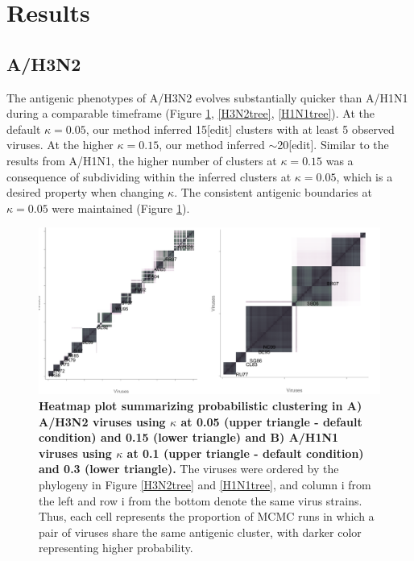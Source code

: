 \documentclass[11pt,oneside,letterpaper]{article}
\begin{document}
\newpage

\section*{Results}

\subsection*{A/H3N2}
The antigenic phenotypes of A/H3N2 evolves substantially quicker than A/H1N1 during a comparable timeframe (Figure \ref{heatmaps}, \ref{H3N2tree}, \ref{H1N1tree}).  %
At the default $\kappa=0.05$, our method inferred 15[edit] clusters with at least 5 observed viruses.  
At the higher $\kappa=0.15$, our method inferred $\sim$20[edit]. 
Similar to the results from A/H1N1, the higher number of clusters at $\kappa=0.15$ was a consequence of subdividing within the inferred clusters at $\kappa=0.05$, which is a desired property when changing $\kappa$.
The consistent antigenic boundaries at $\kappa=0.05$ were maintained (Figure \ref{heatmaps}). 

\begin{figure}[h]
	\centering		
	\includegraphics[width=1\textwidth]{figures/lineArt/combine_h3n2_h1n1_heatmaps}
	\caption{\textbf{Heatmap plot summarizing probabilistic clustering in A) A/H3N2 viruses using $\kappa$ at 0.05 (upper triangle - default condition) and 0.15 (lower triangle) and  B) A/H1N1 viruses using $\kappa$ at 0.1 (upper triangle - default condition) and 0.3 (lower triangle).}
The viruses were ordered by the phylogeny in Figure \ref{H3N2tree} and \ref{H1N1tree}, and column i from the left and row i from the bottom denote the same virus strains.
Thus, each cell represents the proportion of MCMC runs in which a pair of viruses share the same antigenic cluster, with darker color representing higher probability.  
	 		} 
	\label{heatmaps} 
\end{figure}
\end{document}
